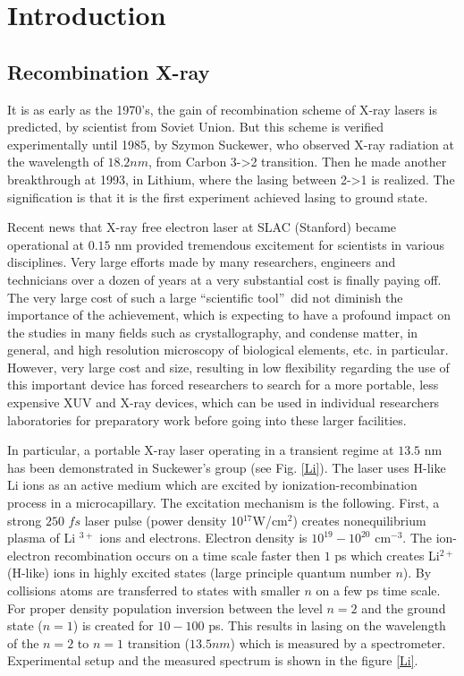 \chapter{Introduction\label{ch:intro}}

\section{Recombination X-ray}
It is as early as the 1970's, the gain of recombination scheme of
X-ray lasers is predicted, by scientist from Soviet Union. But this
scheme is verified experimentally until 1985, by Szymon Suckewer,
who observed X-ray radiation at the wavelength of $18.2nm$, from
Carbon 3->2 transition. Then he made another breakthrough at 1993, in
Lithium, where the lasing between 2->1 is realized. The signification
is that it is the first experiment achieved lasing to ground state.

Recent news that X-ray free electron laser at SLAC (Stanford) became
operational at $0.15$ nm provided tremendous excitement for scientists in
various disciplines. Very large efforts made by many researchers, engineers
and technicians over a dozen of years at a very substantial cost is finally
paying off. The very large cost of such a large \textquotedblleft scientific
tool\textquotedblright\ did not diminish the importance of the achievement,
which is expecting to have a profound impact on the studies in many fields
such as crystallography, and condense matter, in general, and high
resolution microscopy of biological elements, etc. in particular. However,
very large cost and size, resulting in low flexibility regarding the use of
this important device has forced researchers to search for a more portable,
less expensive XUV and X-ray devices, which can be used in individual
researchers laboratories for preparatory work before going into these larger
facilities.

In particular, a portable X-ray laser operating in a transient regime at $%
13.5$ nm has been demonstrated in Suckewer's group \cite{Koro96} (see Fig. %
\ref{Li}). The laser uses H-like Li ions as an active medium which are
excited by ionization-recombination process in a microcapillary. The
excitation mechanism is the following. First, a strong $250$ $fs$ laser
pulse (power density 10$^{17}$W/cm$^{2}$) creates nonequilibrium plasma of Li%
$^{3+}$ ions and electrons. Electron density is $10^{19}-10^{20}$ cm$^{-3}$.
The ion-electron recombination occurs on a time scale faster then $1$ ps
which creates Li$^{2+}$ (H-like) ions in highly excited states (large
principle quantum number $n$). By collisions atoms are transferred to states
with smaller $n$ on a few ps time scale. For proper density population
inversion between the level $n=2$ and the ground state ($n=1$) is created
for $10-100$ ps. This results in lasing on the wavelength of the $n=2$ to $%
n=1$ transition ($13.5nm$) which is measured by a spectrometer. Experimental
setup and the measured spectrum is shown in the figure \ref{Li}.

